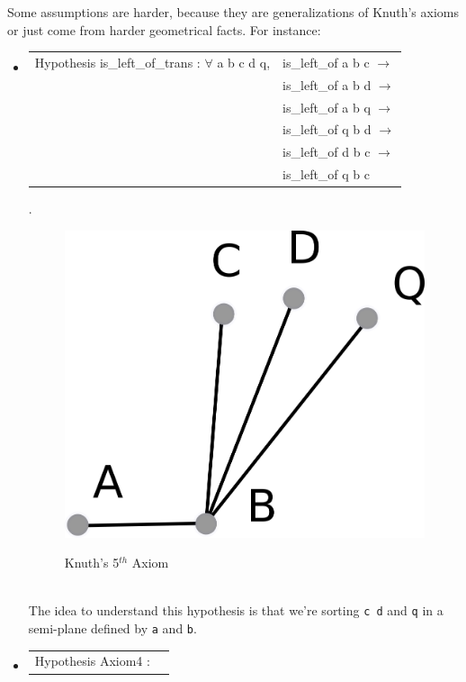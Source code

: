 \documentclass[a4paper,10pt]{article}
\begin{document}
Some assumptions are harder, because they are generalizations of Knuth's axioms or just come from harder geometrical facts. For instance:
\begin{itemize}
\item {\tt \begin{tabular}{ll} Hypothesis is\_left\_of\_trans : 
             $\forall$ a b c d q, &is\_left\_of a b c $\rightarrow$\\
                                           &is\_left\_of a b d $\rightarrow$\\
                                           &is\_left\_of a b q $\rightarrow$\\
                                           &is\_left\_of q b d $\rightarrow$\\
                                           &is\_left\_of d b c $\rightarrow$\\
                                           &is\_left\_of q b c 
           \end{tabular}}.
\\
\begin{figure}[h]
\centering
\caption{Knuth's 5$^{th}$ Axiom}
\includegraphics[scale=2]{Axiom5}\\
\end{figure}\\
The idea to understand this hypothesis is that we're sorting {\tt c d} and {\tt q} in a semi-plane defined by {\tt a} and {\tt b}.
\item {\tt \begin{tabular}{ll} Hypothesis Axiom4 : 

\end{tabular}}
\end{itemize}
\end{document}

